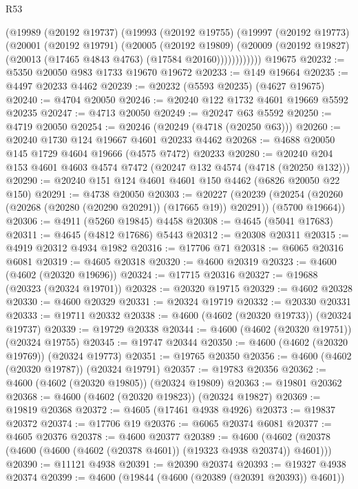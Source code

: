 \begin{lexlean}{R53}
\begin{coremodule}
            (@19989
              (@20192 @19737)
              (@19993
                (@20192 @19755)
                (@19997
                  (@20192 @19773)
                  (@20001
                    (@20192 @19791)
                    (@20005
                      (@20192 @19809)
                      (@20009
                        (@20192 @19827)
                        (@20013 (@17465 @4843 @4763) (@17584 @20160))))))))))))
    @19675
@20232 := @5350 @20050 @983 @1733 @19670 @19672
@20233 := @149 @19664
@20235 := @4497 @20233 @4462
@20239 := @20232 (@5593 @20235) (@4627 @19675)
@20240 := @4704 @20050
@20246 := @20240 @122 @1732 @4601 @19669 @5592 @20235
@20247 := @4713 @20050
@20249 := @20247 @63 @5592
@20250 := @4719 @20050
@20254 := @20246 (@20249 (@4718 (@20250 @63)))
@20260 := @20240 @1730 @124 @19667 @4601 @20233 @4462
@20268 := @4688 @20050 @145 @1729 @4604 @19666 (@4575 @7472) @20233
@20280 := @20240 @204 @153 @4601 @4603 @4574 @7472 (@20247 @132 @4574 (@4718 (@20250 @132)))
@20290 := @20240 @151 @124 @4601 @4601 @150 @4462 (@6826 @20050 @22 @150)
@20291 := @4738 @20050
@20303 := @20227
    (@20239 (@20254 (@20260 (@20268 (@20280 (@20290 @20291)) (@17665 @19)) @20291)) (@5700 @19664))
@20306 := @4911 (@5260 @19845) @4458
@20308 := @4645 (@5041 @17683)
@20311 := @4645 (@4812 @17686) @5443
@20312 := @20308 @20311
@20315 := @4919 @20312 @4934 @1982
@20316 := @17706 @71
@20318 := @6065 @20316 @6081
@20319 := @4605 @20318
@20320 := @4600 @20319
@20323 := @4600 (@4602 (@20320 @19696))
@20324 := @17715 @20316
@20327 := @19688 (@20323 (@20324 @19701))
@20328 := @20320 @19715
@20329 := @4602 @20328
@20330 := @4600 @20329
@20331 := @20324 @19719
@20332 := @20330 @20331
@20333 := @19711 @20332
@20338 := @4600 (@4602 (@20320 @19733)) (@20324 @19737)
@20339 := @19729 @20338
@20344 := @4600 (@4602 (@20320 @19751)) (@20324 @19755)
@20345 := @19747 @20344
@20350 := @4600 (@4602 (@20320 @19769)) (@20324 @19773)
@20351 := @19765 @20350
@20356 := @4600 (@4602 (@20320 @19787)) (@20324 @19791)
@20357 := @19783 @20356
@20362 := @4600 (@4602 (@20320 @19805)) (@20324 @19809)
@20363 := @19801 @20362
@20368 := @4600 (@4602 (@20320 @19823)) (@20324 @19827)
@20369 := @19819 @20368
@20372 := @4605 (@17461 @4938 @4926)
@20373 := @19837 @20372
@20374 := @17706 @19
@20376 := @6065 @20374 @6081
@20377 := @4605 @20376
@20378 := @4600 @20377
@20389 := @4600 (@4602 (@20378 (@4600 (@4600 (@4602 (@20378 @4601)) (@19323 @4938 @20374)) @4601)))
@20390 := @11121 @4938
@20391 := @20390 @20374
@20393 := @19327 @4938 @20374
@20399 := @4600 (@19844 (@4600 (@20389 (@20391 @20393)) @4601))

\end{coremodule}
\end{lexlean}

